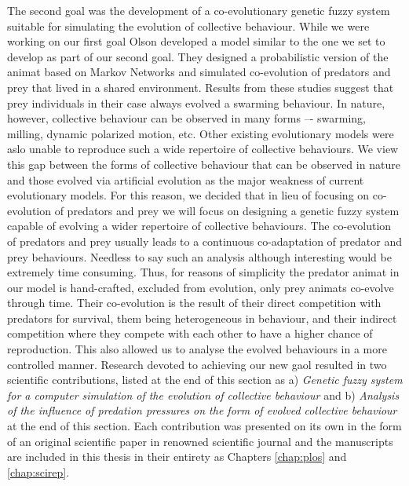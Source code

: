 The second goal was the development of a co-evolutionary genetic fuzzy system suitable for simulating the evolution of collective behaviour. While we were working on our first goal Olson\etal \cite{olson2013critical,olson2013predator,olson2016evolution} developed a model similar to the one we set to develop as part of our second goal. They designed a probabilistic version of the animat based on Markov Networks and simulated co-evolution of predators and prey that lived in a shared environment. Results from these studies suggest that prey individuals in their case always evolved a swarming behaviour. In nature, however, collective behaviour can be observed in many forms –- swarming, milling, dynamic polarized motion, etc. Other existing evolutionary models \cite{biswas2014causes,hein2015evolution,olson2013predator,olson2015exploring,olson2016evolution,reynolds1993evolved,sayers2009evolved,spector2003emergence,wood2007evolving} were aslo unable to reproduce such a wide repertoire of collective behaviours. We view this gap between the forms of collective behaviour that can be observed in nature and those evolved via artificial evolution as the major weakness of current evolutionary models. For this reason, we decided that in lieu of focusing on co-evolution of predators and prey we will focus on designing a genetic fuzzy system capable of evolving a wider repertoire of collective behaviours. The co-evolution of predators and prey usually leads to a continuous co-adaptation of predator and prey behaviours. Needless to say such an analysis although interesting would be extremely time consuming. Thus, for reasons of simplicity the predator animat in our model is hand-crafted, \ie excluded from evolution, only prey animats co-evolve through time. Their co-evolution is the result of their direct competition with predators for survival, them being heterogeneous in behaviour, and their indirect competition where they compete with each other to have a higher chance of reproduction. This also allowed us to analyse the evolved behaviours in a more controlled manner. Research devoted to achieving our new gaol resulted in two scientific contributions, listed at the end of this section as a) \emph{Genetic fuzzy system for a computer simulation of the evolution of collective behaviour} and b) \emph{Analysis of the influence of predation pressures on the form of evolved collective behaviour} at the end of this section. Each contribution was presented on its own in the form of an original scientific paper in renowned scientific journal and the manuscripts are included in this thesis in their entirety as Chapters \ref{chap:plos} and \ref{chap:scirep}.

